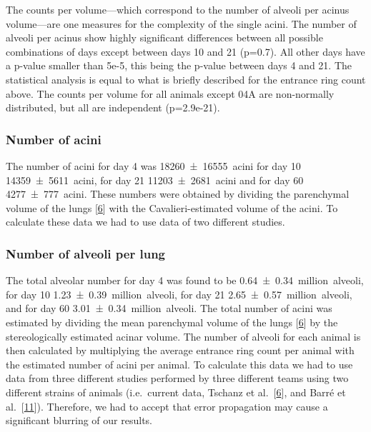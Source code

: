 \documentclass[
  american,
]{article}
\begin{document}
The counts per volume---which correspond to the number of alveoli per acinus volume---are one measures for the complexity of the single acini.
The number of alveoli per acinus show highly significant differences between all possible combinations of days except between days 10 and 21 (p=0.7).
All other days have a p-value smaller than 5e-5, this being the p-value between days 4 and 21.
The statistical analysis is equal to what is briefly described for the entrance ring count above.
The counts per volume for all animals except 04A are non-normally distributed, but all are independent (p=2.9e-21).

\hypertarget{number-of-acini}{%
\subsubsection{Number of acini}\label{number-of-acini}}

The number of acini for day 4 was 18260~±~16555~acini for day 10 14359~±~5611~acini, for day 21 11203~±~2681~acini and for day 60 4277~±~777~acini.
These numbers were obtained by dividing the parenchymal volume of the lungs {[}\protect\hyperlink{ref-wnl86DEM}{6}{]} with the Cavalieri-estimated volume of the acini.
To calculate these data we had to use data of two different studies.

\hypertarget{number-of-alveoli-per-lung}{%
\subsubsection{Number of alveoli per lung}\label{number-of-alveoli-per-lung}}

The total alveolar number for day 4 was found to be 0.64~±~0.34~million~alveoli, for day 10 1.23~±~0.39~million~alveoli, for day 21 2.65~±~0.57~million~alveoli, and for day 60 3.01~±~0.34~million~alveoli.
The total number of acini was estimated by dividing the mean parenchymal volume of the lungs {[}\protect\hyperlink{ref-wnl86DEM}{6}{]} by the stereologically estimated acinar volume.
The number of alveoli for each animal is then calculated by multiplying the average entrance ring count per animal with the estimated number of acini per animal.
To calculate this data we had to use data from three different studies performed by three different teams using two different strains of animals (i.e.~current data, Tschanz et al.~{[}\protect\hyperlink{ref-wnl86DEM}{6}{]}, and Barré et al.~{[}\protect\hyperlink{ref-uFNlWogb}{11}{]}).
Therefore, we had to accept that error propagation may cause a significant blurring of our results.
\end{document}

